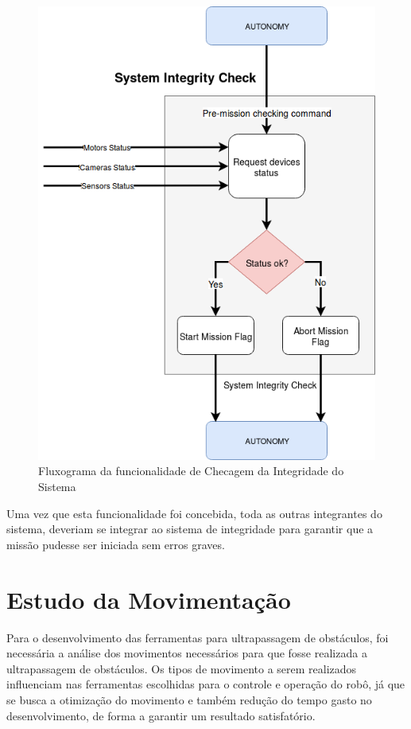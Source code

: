 \begin{figure}[H]
	\centering
	\includegraphics[scale=0.4]{Figures/sys_check_flux.png}
	\caption{Fluxograma da funcionalidade de Checagem da Integridade do Sistema}
	\label{fig:fluxo_check}
\end{figure}
Uma vez que esta funcionalidade foi concebida, toda as outras integrantes do sistema, deveriam se integrar ao sistema de integridade para garantir que a missão pudesse ser iniciada sem erros graves.

\section{Estudo da Movimentação}\label{sec:estud_mov}
Para o desenvolvimento das ferramentas para ultrapassagem de obstáculos, foi necessária a análise dos movimentos necessários para que fosse realizada a ultrapassagem de obstáculos. Os tipos de movimento a serem realizados influenciam nas ferramentas escolhidas para o controle e operação do robô, já que se busca a otimização do movimento e também redução do tempo gasto no desenvolvimento, de forma a garantir um resultado satisfatório.

